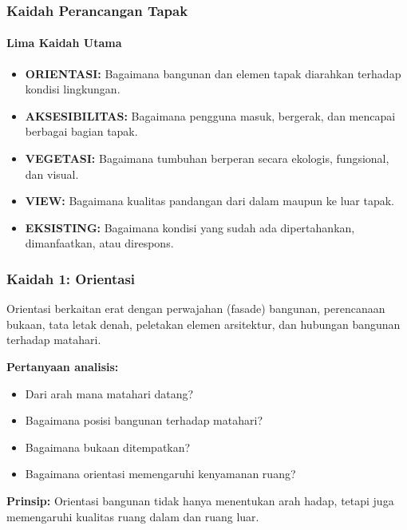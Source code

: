 \documentclass[../main.tex]{subfiles}
\begin{document}
\begin{frame}[mytitle=center, c, mycolor=digiPH_leaf, dark]
	\frametitle{Kaidah Perancangan Tapak}
	\framesubtitle{Lima Kaidah Utama}

	\begin{itemize}
		\item \textbf{ORIENTASI:} Bagaimana bangunan dan elemen tapak diarahkan terhadap kondisi lingkungan.
		\item \textbf{AKSESIBILITAS:} Bagaimana pengguna masuk, bergerak, dan mencapai berbagai bagian tapak.
		\item \textbf{VEGETASI:} Bagaimana tumbuhan berperan secara ekologis, fungsional, dan visual.
		\item \textbf{VIEW:} Bagaimana kualitas pandangan dari dalam maupun ke luar tapak.
		\item \textbf{EKSISTING:} Bagaimana kondisi yang sudah ada dipertahankan, dimanfaatkan, atau direspons.
	\end{itemize}
\end{frame}

\begin{frame}[mytitle=standard, t, mycolor=digiPH_cream, light]
	\frametitle{Kaidah 1: Orientasi}

	Orientasi berkaitan erat dengan perwajahan (fasade) bangunan, perencanaan bukaan, tata letak denah, peletakan elemen arsitektur, dan hubungan bangunan terhadap matahari.

	\vspace{0.3cm}
	\textbf{Pertanyaan analisis:}
	\begin{itemize}
		\item Dari arah mana matahari datang?
		\item Bagaimana posisi bangunan terhadap matahari?
		\item Bagaimana bukaan ditempatkan?
		\item Bagaimana orientasi memengaruhi kenyamanan ruang?
	\end{itemize}

	\vspace{0.3cm}
	\textbf{Prinsip:} Orientasi bangunan tidak hanya menentukan arah hadap, tetapi juga memengaruhi kualitas ruang dalam dan ruang luar.
\end{frame}
\end{document}
